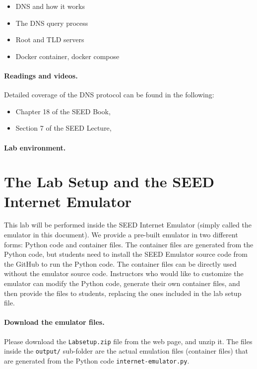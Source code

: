 \begin{itemize}[noitemsep]
\item DNS and how it works
\item The DNS query process
\item Root and TLD servers
\item Docker container, docker compose
\end{itemize}


\paragraph{Readings and videos.}
Detailed coverage of the DNS protocol can be found in the following:

\begin{itemize}
\item Chapter 18 of the SEED Book, \seedbook
\item Section 7 of the SEED Lecture, \seedisvideo
\end{itemize}


\paragraph{Lab environment.} 
\seedenvironmentB
\nodependency


\section{The Lab Setup and the SEED Internet Emulator}

This lab will be performed inside the SEED Internet Emulator (simply
called the emulator in this document).
We provide a pre-built emulator in two different forms: Python code
and container files. The container files are generated from
the Python code, but students need to install the SEED Emulator source
code from the GitHub to run the Python code. The container files
can be directly used without the emulator source code.
Instructors who would like to customize the emulator can modify the Python
code, generate their own container files, and then provide the
files to students, replacing the ones included in the
lab setup file.


\paragraph{Download the emulator files.}
Please download the \texttt{Labsetup.zip} file from the web page, and
unzip it. The files inside the \texttt{output/} sub-folder are the actual
emulation files (container files) that are
generated from the Python code \texttt{internet-emulator.py}.



